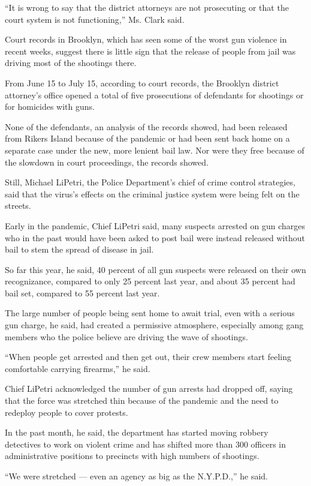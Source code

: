 ``It is wrong to say that the district attorneys are not prosecuting or
that the court system is not functioning,'' Ms. Clark said.

Court records in Brooklyn, which has seen some of the worst gun violence
in recent weeks, suggest there is little sign that the release of people
from jail was driving most of the shootings there.

From June 15 to July 15, according to court records, the Brooklyn
district attorney's office opened a total of five prosecutions of
defendants for shootings or for homicides with guns.

None of the defendants, an analysis of the records showed, had been
released from Rikers Island because of the pandemic or had been sent
back home on a separate case under the new, more lenient bail law. Nor
were they free because of the slowdown in court proceedings, the records
showed.

Still, Michael LiPetri, the Police Department's chief of crime control
strategies, said that the virus's effects on the criminal justice system
were being felt on the streets.

Early in the pandemic, Chief LiPetri said, many suspects arrested on gun
charges who in the past would have been asked to post bail were instead
released without bail to stem the spread of disease in jail.

So far this year, he said, 40 percent of all gun suspects were released
on their own recognizance, compared to only 25 percent last year, and
about 35 percent had bail set, compared to 55 percent last year.

The large number of people being sent home to await trial, even with a
serious gun charge, he said, had created a permissive atmosphere,
especially among gang members who the police believe are driving the
wave of shootings.

``When people get arrested and then get out, their crew members start
feeling comfortable carrying firearms,'' he said.

Chief LiPetri acknowledged the number of gun arrests had dropped off,
saying that the force was stretched thin because of the pandemic and the
need to redeploy people to cover protests.

In the past month, he said, the department has started moving robbery
detectives to work on violent crime and has shifted more than 300
officers in administrative positions to precincts with high numbers of
shootings.

``We were stretched --- even an agency as big as the N.Y.P.D.,'' he
said.

